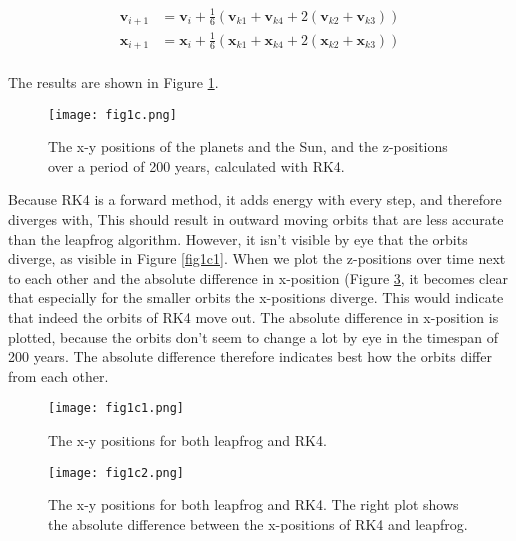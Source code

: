 \begin{align}
    \mathbf{v}_{i+1} &= \mathbf{v}_{i} + \frac{1}{6} (\mathbf{v}_{k1} + \mathbf{v}_{k4} + 2(\mathbf{v}_{k2} + \mathbf{v}_{k3})) \\
    \mathbf{x}_{i+1} &= \mathbf{x}_{i} + \frac{1}{6} (\mathbf{x}_{k1} + \mathbf{x}_{k4} + 2(\mathbf{x}_{k2} + \mathbf{x}_{k3})) \\
\end{align}

The results are shown in Figure \ref{fig:1c}.
\begin{figure}[h!]
  \centering
  \texttt{[image: fig1c.png]}
  \caption{The x-y positions of the planets and the Sun, and the z-positions over a period of 200 years, calculated with RK4.}
  \label{fig:1c}
\end{figure}

Because RK4 is a forward method, it adds energy with every step, and therefore diverges with, This should result in outward moving orbits that are less accurate than the leapfrog algorithm. However, it isn't visible by eye that the orbits diverge, as visible in  Figure \ref{fig1c1}. When we plot the z-positions over time next to each other and the absolute difference in x-position (Figure \ref{fig:1c2}, it becomes clear that especially for the smaller orbits the x-positions diverge. This would indicate that indeed the orbits of RK4 move out. The absolute difference in x-position is plotted, because the orbits don't seem to change a lot by eye in the timespan of 200 years. The absolute difference therefore indicates best how the orbits differ from each other. 
\begin{figure}[h!]
  \centering
  \texttt{[image: fig1c1.png]}
  \caption{The x-y positions for both leapfrog and RK4.}
  \label{fig:1c1}
\end{figure}

\begin{figure}[h!]
  \centering
  \texttt{[image: fig1c2.png]}
  \caption{The x-y positions for both leapfrog and RK4. The right plot shows the absolute difference between the x-positions of RK4 and leapfrog.}
  \label{fig:1c2}
\end{figure}
